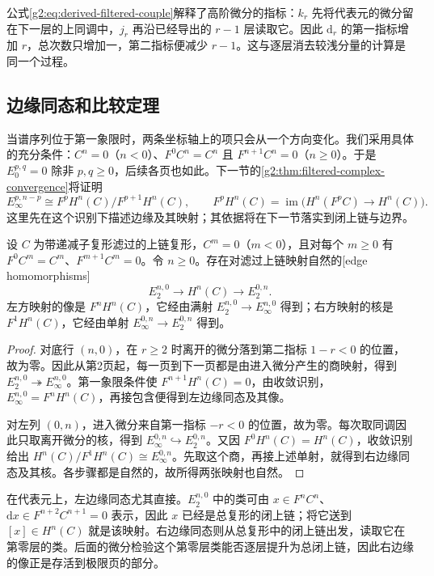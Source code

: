 公式\eqref{g2:eq:derived-filtered-couple}解释了高阶微分的指标：\(k_r\) 先将代表元的微分留在下一层的上同调中，\(j_r\) 再沿已经导出的 \(r-1\) 层读取它。因此 \(\mathrm d_r\) 的第一指标增加 \(r\)，总次数只增加一，第二指标便减少 \(r-1\)。这与逐层消去较浅分量的计算是同一个过程。

\subsection{边缘同态和比较定理}
\label{g2:subsec:1003:03}

当谱序列位于第一象限时，两条坐标轴上的项只会从一个方向变化。我们采用具体的充分条件：\(C^n=0\)（\(n<0\)）、\(F^0C^n=C^n\) 且 \(F^{n+1}C^n=0\)（\(n\ge0\)）。于是 \(E_0^{p,q}=0\) 除非 \(p,q\ge0\)，后续各页也如此。下一节的\cref{g2:thm:filtered-complex-convergence}将证明
\[
	E_\infty^{p,n-p}\cong F^pH^n(C)/F^{p+1}H^n(C),\qquad
	F^pH^n(C)=\operatorname{im}\bigl(H^n(F^pC)\to H^n(C)\bigr).
\]
这里先在这个识别下描述边缘及其映射；其依据将在下一节落实到闭上链与边界。

\begin{proposition}\label{g2:prop:spectral-sequence-edge-maps}
	设 \(C\) 为带递减子复形滤过的上链复形，\(C^m=0\)（\(m<0\)），且对每个 \(m\ge0\) 有 \(F^0C^m=C^m\)、\(F^{m+1}C^m=0\)。令 \(n\ge0\)。存在对滤过上链映射自然的[edge homomorphisms]
	\[
		E_2^{n,0}\longrightarrow H^n(C)\longrightarrow E_2^{0,n}.
	\]
	左方映射的像是 \(F^nH^n(C)\)，它经由满射 \(E_2^{n,0}\to E_\infty^{n,0}\) 得到；右方映射的核是 \(F^1H^n(C)\)，它经由单射 \(E_\infty^{0,n}\to E_2^{0,n}\) 得到。
\end{proposition}
\begin{proof}
	对底行 \((n,0)\)，在 \(r\ge2\) 时离开的微分落到第二指标 \(1-r<0\) 的位置，故为零。因此从第2页起，每一页到下一页都是由进入微分产生的商映射，得到 \(E_2^{n,0}\twoheadrightarrow E_\infty^{n,0}\)。第一象限条件使 \(F^{n+1}H^n(C)=0\)，由收敛识别，\(E_\infty^{n,0}=F^nH^n(C)\)，再接包含便得到左边缘同态及其像。

	对左列 \((0,n)\)，进入微分来自第一指标 \(-r<0\) 的位置，故为零。每次取同调因此只取离开微分的核，得到 \(E_\infty^{0,n}\hookrightarrow E_2^{0,n}\)。又因 \(F^0H^n(C)=H^n(C)\)，收敛识别给出 \(H^n(C)/F^1H^n(C)\cong E_\infty^{0,n}\)。先取这个商，再接上述单射，就得到右边缘同态及其核。各步骤都是自然的，故所得两张映射也自然。
\end{proof}

在代表元上，左边缘同态尤其直接。\(E_2^{n,0}\) 中的类可由 \(x\in F^nC^n\)、\(\mathrm dx\in F^{n+2}C^{n+1}=0\) 表示，因此 \(x\) 已经是总复形的闭上链；将它送到 \([x]\in H^n(C)\) 就是该映射。右边缘同态则从总复形中的闭上链出发，读取它在第零层的类。后面的微分检验这个第零层类能否逐层提升为总闭上链，因此右边缘的像正是存活到极限页的部分。


